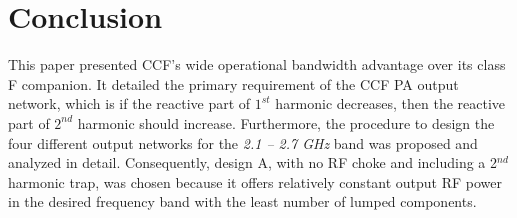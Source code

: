 \documentclass[conference]{IEEEtran}
\begin{document}
\section{Conclusion}
\label{section:Conclusion}
This paper presented CCF's wide operational bandwidth advantage over its class F companion. It detailed the primary requirement of the CCF PA output network, which is if the reactive part of $1^{st}$ harmonic decreases, then the reactive part of $2^{nd}$ harmonic should increase. Furthermore, the procedure to design the four different output networks for the \textit{2.1 -- 2.7 GHz} band was proposed and analyzed in detail.  Consequently, design A, with no RF choke and  including a 2$^{nd}$ harmonic trap, was chosen because it offers relatively constant output RF power in the desired frequency band with the least number of lumped components.



\end{document}
